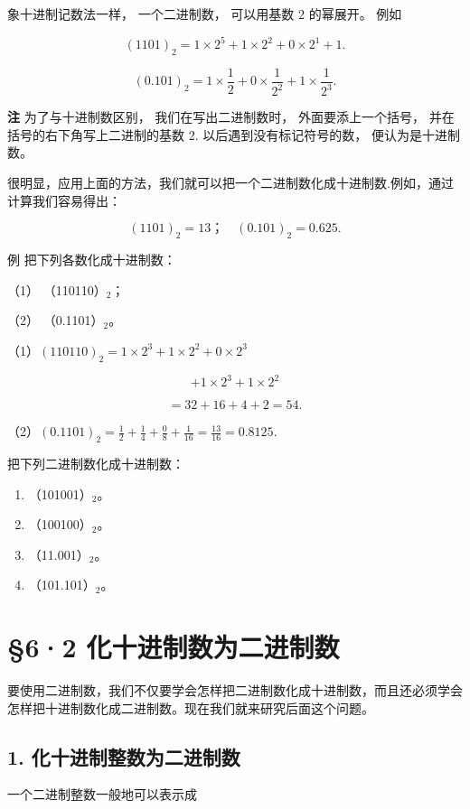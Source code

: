 象十进制记数法一样， 一个二进制数， 可以用基数 2 的幂展开。 例如

\[
(1101) _{2} = 1 \times 2 ^{5} + 1 \times 2 ^{2} + 0 \times 2 ^{1} + 1.
\]

\[
(0.101) _{2} = 1 \times \frac{1}{2} + 0 \times \frac{1}{2 ^{2}} + 1 \times \frac{1}{2 ^{3}}.
\]

\textbf{注} 为了与十进制数区别， 我们在写出二进制数时，
外面要添上一个括号， 并在括号的右下角写上二进制的基数 2.
以后遇到没有标记符号的数， 便认为是十进制数。

很明显，应用上面的方法，我们就可以把一个二进制数化成十进制数.例如，通过计算我们容易得出：

\[
(1101) _{2} = 13\text{；} \quad (0.101) _{2} = 0.625.
\]

例 把下列各数化成十进制数：

（1） （110110）\(_{2}\)；

（2） （0.1101）\(_{2}\)。

（1）\((110110)_2 = 1 \times 2^3 + 1 \times 2^2 + 0 \times 2^3\)

\[
+ 1 \times 2 ^{3} + 1 \times 2 ^{2}
\]

\[
= 32 + 16 + 4 + 2 = 54.
\]

（2）\((0.1101)_2 = \frac{1}{2} + \frac{1}{4} + \frac{0}{8} + \frac{1}{16} = \frac{13}{16} = 0.8125.\)

把下列二进制数化成十进制数：

\begin{enumerate}
\item
  （101001）\(_{2}\)。
\item
  （100100）\(_{2}\)。
\item
  （11.001）\(_{2}\)。
\item
  （101.101）\(_{2}\)。
\end{enumerate}

\section{§6·2 化十进制数为二进制数}

要使用二进制数，我们不仅要学会怎样把二进制数化成十进制数，而且还必须学会怎样把十进制数化成二进制数。现在我们就来研究后面这个问题。

\subsection{1. 化十进制整数为二进制数}

一个二进制整数一般地可以表示成

